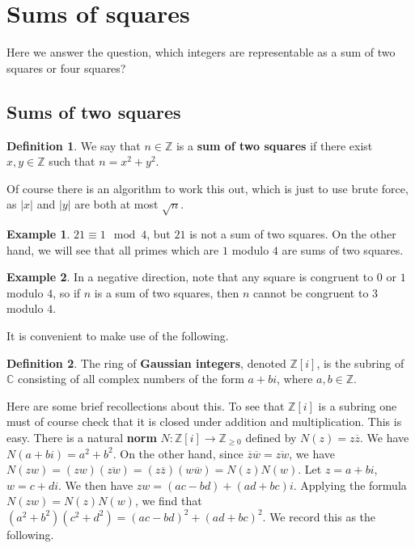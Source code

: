 \documentclass{article}
\newcommand{\Z}{\mathbb{Z}}
\newcommand{\C}{\mathbb{C}}
\newcommand{\rb}[1]{\left( #1 \right)}
\renewcommand{\sb}[1]{\left[ #1 \right]}
\newcommand{\abs}[1]{\left\lvert #1 \right\rvert}
\theoremstyle{definition}\newtheorem{definition}{Definition}
\theoremstyle{definition}\newtheorem{remark}[definition]{Remark}
\theoremstyle{definition}\newtheorem*{example}{Example}
\theoremstyle{definition}\newtheorem*{note}{Note}
\begin{document}
\section{Sums of squares}

Here we answer the question, which integers are representable as a sum of two squares or four squares?

\subsection{Sums of two squares}

\begin{definition}
We say that $ n \in \Z $ is a \textbf{sum of two squares} if there exist $ x, y \in \Z $ such that $ n = x^2 + y^2 $.
\end{definition}

Of course there is an algorithm to work this out, which is just to use brute force, as $ \abs{x} $ and $ \abs{y} $ are both at most $ \sqrt{n} $.

\begin{example}
$ 21 \equiv 1 \mod 4 $, but $ 21 $ is not a sum of two squares. On the other hand, we will see that all primes which are $ 1 $ modulo $ 4 $ are sums of two squares.
\end{example}

\begin{example}
In a negative direction, note that any square is congruent to $ 0 $ or $ 1 $ modulo $ 4 $, so if $ n $ is a sum of two squares, then $ n $ cannot be congruent to $ 3 $ modulo $ 4 $.
\end{example}

It is convenient to make use of the following.

\begin{definition}
The ring of \textbf{Gaussian integers}, denoted $ \Z\sb{i} $, is the subring of $ \C $ consisting of all complex numbers of the form $ a + bi $, where $ a, b \in \Z $.
\end{definition}

Here are some brief recollections about this. To see that $ \Z\sb{i} $ is a subring one must of course check that it is closed under addition and multiplication. This is easy. There is a natural \textbf{norm} $ N : \Z\sb{i} \to \Z_{\ge 0} $ defined by $ N\rb{z} = z\overline{z} $. We have $ N\rb{a + bi} = a^2 + b^2 $. On the other hand, since $ \overline{z}\overline{w} = \overline{zw} $, we have $ N\rb{zw} = \rb{zw}\rb{\overline{zw}} = \rb{z\overline{z}}\rb{w\overline{w}} = N\rb{z}N\rb{w} $. Let $ z = a + bi $, $ w = c + di $. We then have $ zw = \rb{ac - bd} + \rb{ad + bc}i $. Applying the formula $ N\rb{zw} = N\rb{z}N\rb{w} $, we find that $ \rb{a^2 + b^2}\rb{c^2 + d^2} = \rb{ac - bd}^2 + \rb{ad + bc}^2 $. We record this as the following.
\end{document}
